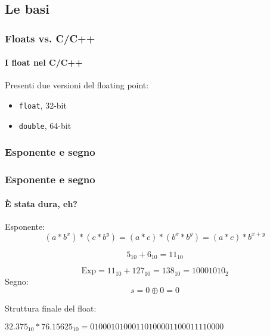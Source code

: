 \documentclass{beamer}
\begin{document}
  \subsection{Le basi}
  \begin{frame}
  	  \frametitle{Floats vs. C/C++}
    \framesubtitle{I float nel C/C++}
  	
    Presenti due versioni del floating point:
    \begin{itemize}
    		\item \texttt{float}, 32-bit
    		\item \texttt{double}, 64-bit
    \end{itemize}
        
    \vspace{1em}
  		
  \end{frame}
  \subsubsection{Esponente e segno}
  \begin{frame}
  \frametitle{Esponente e segno}
  \framesubtitle{È stata dura, eh?}
  		
  		Esponente:
  		\vspace{1em}
  		$$(a*b^{x}) * (c * b^{y}) = (a*c) * (b^{x} * b^{y}) = (a*c) * b^{x+y}$$
  		
  		$$5_{10} + 6_{10} = 11_{10}$$
    
    $$\text{Exp} = 11_{10} + 127_{10} = 138_{10} = 10001010_{2}$$
   	Segno:
   	\vspace{1em}
    $$s = 0 \oplus 0 = 0$$
    
    \pause
		Struttura finale del float:    
    
    \vspace{1em}
   
    $32.375_{10} * 76.15625_{10} = 01000101000110100001100011110000$
  \end{frame}
\end{document}
